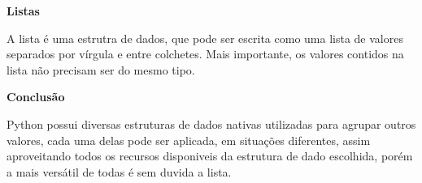 \documentclass[12pt]{article}
\begin{document}
\begin{enumerate}
\textbf{Listas}

A lista é uma estrutra de dados, que pode ser escrita como uma lista de valores separados por vírgula e entre colchetes. Mais importante, os valores contidos na lista não precisam ser do mesmo tipo.


\textbf{Conclusão}

Python possui diversas estruturas de dados nativas utilizadas para agrupar outros valores, cada uma delas pode ser aplicada, em situações diferentes, assim aproveitando todos os recursos disponiveis da estrutura de dado escolhida, porém a mais versátil de todas é sem duvida a lista.




\end{enumerate}
\end{document}
